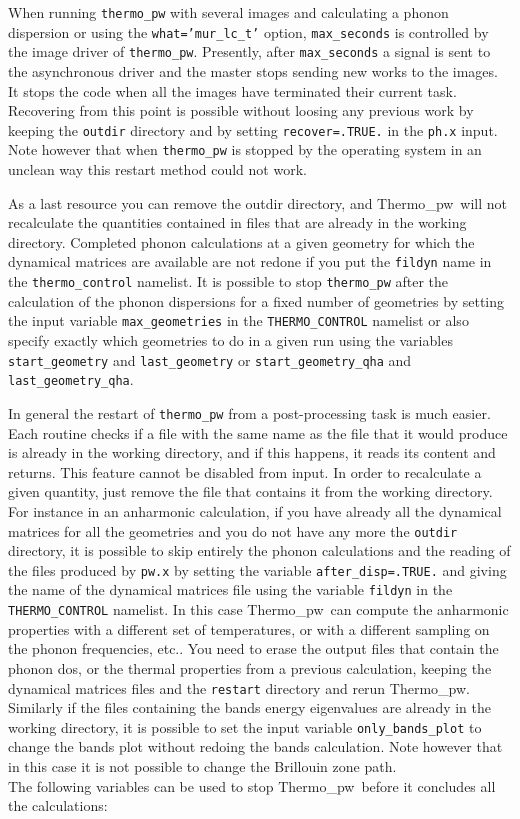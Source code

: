 \documentclass[12pt,a4paper,twoside]{report}
\def\thermo{{\sc Thermo}\_{\sc pw}}
\begin{document}
When running \texttt{thermo\_pw} with several images and
calculating a phonon dispersion or using the \texttt{what='mur\_lc\_t'}
option, \texttt{max\_seconds} is controlled by the image driver of 
\texttt{thermo\_pw}. Presently, after \texttt{max\_seconds} a signal
is sent to the asynchronous driver and the master stops sending new works 
to the images. It stops the code when all the images have terminated their
current task. Recovering from this point is possible without loosing 
any previous work by keeping the \texttt{outdir} directory and by setting 
\texttt{recover=.TRUE.} in the \texttt{ph.x} input.
Note however that when \texttt{thermo\_pw} is stopped by the operating 
system in an unclean way this restart method could not work.

As a last resource you can remove the outdir directory, and \thermo\ 
will not recalculate the quantities contained in files that are already 
in the working directory. Completed phonon calculations at a given
geometry for which the dynamical matrices are available are
not redone if you put the \texttt{fildyn} name in the 
\texttt{thermo\_control} namelist. It is possible to stop 
\texttt{thermo\_pw} after the 
calculation of the phonon dispersions for a fixed number of geometries 
by setting the input variable \texttt{max\_geometries} in the 
\texttt{THERMO\_CONTROL} namelist or also specify exactly which geometries
to do in a given run using the variables \texttt{start\_geometry} and
\texttt{last\_geometry} or \texttt{start\_geometry\_qha} and 
\texttt{last\_geometry\_qha}. 

In general the restart of \texttt{thermo\_pw} from a post-processing task
is much easier.
Each routine checks if a file with the same name
as the file that it would produce is already in the working directory,
and if this happens, it reads its content and returns. This feature cannot be
disabled from input. In order to recalculate a given quantity, just remove
the file that contains it from the working directory.
For instance in an anharmonic calculation, if you have already all 
the dynamical 
matrices for all the geometries and you do not have any more the
\texttt{outdir} directory, it is possible to skip entirely
the phonon calculations and the reading of the files produced by
\texttt{pw.x} by setting the variable
\texttt{after\_disp=.TRUE.} and giving the name of the dynamical matrices file
using the variable \texttt{fildyn} in the \texttt{THERMO\_CONTROL} namelist. 
In this case \thermo\ can compute the anharmonic properties with a 
different set 
of temperatures, or with a different sampling on the phonon frequencies, 
etc.. You need to erase the output files that contain
the phonon dos, or the thermal properties from a previous calculation, keeping 
the dynamical matrices files and the \texttt{restart} directory and 
rerun \thermo.
Similarly if the files containing the bands energy eigenvalues are already
in the working directory, it is possible to set the input variable
\texttt{only\_bands\_plot} to change the bands plot without redoing the
bands calculation. Note however that in this case it is not possible 
to change the Brillouin zone path. \\
The following variables can be used to stop \thermo\ before it concludes all
the calculations:
\end{document}
